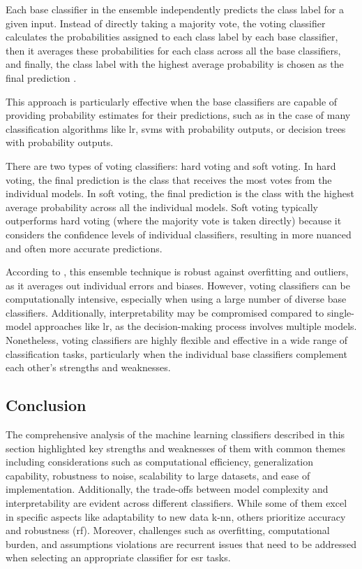 Each base classifier in the ensemble independently predicts the class label for a given input. Instead of directly taking a majority vote, the voting classifier calculates the probabilities assigned to each class label by each base classifier, then it averages these probabilities for each class across all the base classifiers, and finally, the class label with the highest average probability is chosen as the final prediction \cite{Sarkar2019}.

This approach is particularly effective when the base classifiers are capable of providing probability estimates for their predictions, such as in the case of many classification algorithms like \gls{lr}, \gls{svm}s with probability outputs, or decision trees with probability outputs.

There are two types of voting classifiers: hard voting and soft voting. In hard voting, the final prediction is the class that receives the most votes from the individual models. In soft voting, the final prediction is the class with the highest average probability across all the individual models. Soft voting typically outperforms hard voting (where the majority vote is taken directly) because it considers the confidence levels of individual classifiers, resulting in more nuanced and often more accurate predictions.

According to \textcite{Sarkar2019}, this ensemble technique is robust against overfitting and outliers, as it averages out individual errors and biases. However, voting classifiers can be computationally intensive, especially when using a large number of diverse base classifiers. Additionally, interpretability may be compromised compared to single-model approaches like \gls{lr}, as the decision-making process involves multiple models. Nonetheless, voting classifiers are highly flexible and effective in a wide range of classification tasks, particularly when the individual base classifiers complement each other's strengths and weaknesses.


\subsection{Conclusion}
\label{subsec:machine_learning_conclusion}

The comprehensive analysis of the machine learning classifiers described in this section highlighted key strengths and weaknesses of them with common themes including considerations such as computational efficiency, generalization capability, robustness to noise, scalability to large datasets, and ease of implementation. Additionally, the trade-offs between model complexity and interpretability are evident across different classifiers. While some of them excel in specific aspects like adaptability to new data \gls{k-nn}, others prioritize accuracy and robustness (\gls{rf}). Moreover, challenges such as overfitting, computational burden, and assumptions violations are recurrent issues that need to be addressed when selecting an appropriate classifier for \gls{esr} tasks. 


